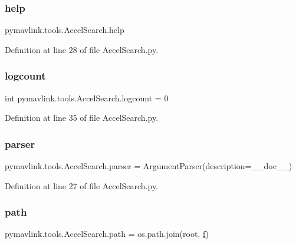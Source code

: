 \subsubsection{\texorpdfstring{help}{help}}
{\footnotesize\ttfamily pymavlink.\+tools.\+Accel\+Search.\+help}



Definition at line 28 of file Accel\+Search.\+py.

\mbox{\label{namespacepymavlink_1_1tools_1_1AccelSearch_adfb9f84bfd3c391863e97281c326d0f5}} 
\subsubsection{\texorpdfstring{logcount}{logcount}}
{\footnotesize\ttfamily int pymavlink.\+tools.\+Accel\+Search.\+logcount = 0}



Definition at line 35 of file Accel\+Search.\+py.

\mbox{\label{namespacepymavlink_1_1tools_1_1AccelSearch_ad06281c25f5ea505bac4b15673f6ede4}} 
\subsubsection{\texorpdfstring{parser}{parser}}
{\footnotesize\ttfamily pymavlink.\+tools.\+Accel\+Search.\+parser = Argument\+Parser(description=\+\_\+\+\_\+doc\+\_\+\+\_\+)}



Definition at line 27 of file Accel\+Search.\+py.

\mbox{\label{namespacepymavlink_1_1tools_1_1AccelSearch_a533fc9b3de465371a337da46d8f3e000}} 
\subsubsection{\texorpdfstring{path}{path}}
{\footnotesize\ttfamily pymavlink.\+tools.\+Accel\+Search.\+path = os.\+path.\+join(root, \mbox{\hyperlink{namespacepymavlink_1_1tools_1_1AccelSearch_a2127731e1cc2c0698014708e428ffc5e}{f}})}



